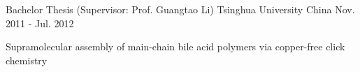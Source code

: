 \begin{cventries}
\cventry
{Bachelor Thesis (Supervisor: Prof.  Guangtao Li)} %
{Tsinghua University} %
{China} %
{Nov. 2011 - Jul. 2012} %
{
  \begin{cvitems}
  \item Supramolecular assembly of main-chain bile acid polymers via copper-free click chemistry
  \end{cvitems}
}
\end{cventries}

